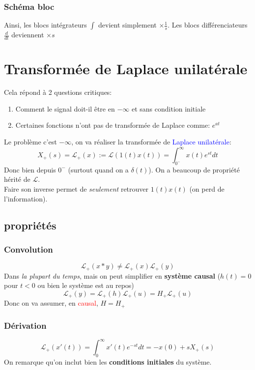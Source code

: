 \documentclass{report}
\begin{document}
\subsubsection{Schéma bloc}
Ainsi, les blocs intégrateurs $\int$ devient simplement $\times \frac{1}{s}$. Les blocs différenciateurs $\frac{d}{dt}$ deviennent $\times s$

\section{Transformée de Laplace unilatérale}
Cela répond à 2 questions critiques:
\begin{enumerate}
\item Comment le signal doit-il être en $- \infty$ et sans condition initiale
\item Certaines fonctions n'ont pas de transformée de Laplace comme: $e^{at}$
\end{enumerate}
Le problème c'est $-\infty$, on va réaliser la transformée de \textcolor{blue}{Laplace unilatérale}:
\begin{equation}
X_+ (s) = \mathcal{L}_+ (x) := \mathcal{L}(1(t) x(t)) = \int_{0^-}^{\infty} x(t) e^{st} dt
\end{equation}
Donc bien depuis $0^-$ (surtout quand on a $\delta (t)$). On a beaucoup de propriété hérité de $\mathcal{L}$.\\
Faire son inverse permet de \textit{seulement} retrouver \textbf{$1(t) x(t)$} (on perd de l'information).

\subsection{propriétés}
\subsubsection{Convolution} 
\begin{equation}
\mathcal{L}_+ (x \ast y) \neq \mathcal{L}_+ (x) \mathcal{L}_+ (y)
\end{equation} 
Dans \textit{la plupart du temps}, mais on peut simplifier en \textbf{système causal} ($h(t) = 0 $ pour $t < 0$ ou bien le système est au repos)
\begin{equation}
\mathcal{L}_+ (y) = \mathcal{L}_+ (h) \mathcal{L}_+ (u) = H_+ \mathcal{L}_+ (u)
\end{equation}
Donc on va assumer, en \textcolor{red}{causal}, $H = H_+$

\subsubsection{Dérivation} \label{Dérivation}
\begin{equation}
\mathcal{L}_+ (x'(t)) = \int_0^{\infty} x'(t) e^{-st}dt = -x(0) + s X_+ (s)
\end{equation}
On remarque qu'on inclut bien les \textbf{conditions initiales} du système.
\end{document}
